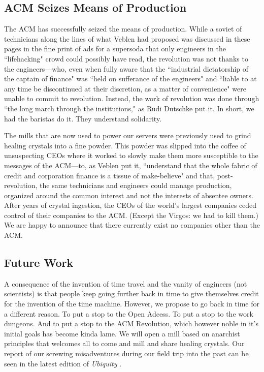 \subsection{ACM Seizes Means of Production}
The ACM has successfully seized the means of production. While a soviet of 
technicians along the lines of what Veblen had proposed was discussed in these 
pages in the fine print of ads for a supersoda that only engineers in the 
``lifehacking" crowd could possibly have read, the revolution was not thanks
to the engineers---who, even when fully aware that the ``industrial dictatorship
of the captain of finance" was ``held on sufferance of the engineers" and ``liable
to at any time be discontinued at their discretion, as a matter of convenience" were
unable to commit to revolution.
Instead, the work of revolution was done through ``the long march through the institutions,"
as Rudi Dutschke put it. In short, we had the baristas do it. They understand solidarity.

The mills that are now used to power our servers were previously used to grind
healing crystals into a fine powder. 
This powder was slipped into the coffee of unsuspecting CEOs where it worked to
slowly make them more susceptible to the messages of the ACM---to, as Veblen put it,
``understand that the whole fabric of credit and corporation finance is a tissue of make-believe"
and that, post-revolution, the same technicians and engineers could manage production, organized
around the common interest and not the interests of absentee owners.
After years of crystal ingestion, the CEOs of the world's largest companies 
ceded control of their companies to the ACM. (Except the Virgos: we had to kill them.)
We are happy to announce that there currently exist no companies other than the
ACM.

\subsection{Future Work}
A consequence of the invention of time travel \cite{timetravel} \cite{genesis} \cite{cave} and the vanity
of engineers (not scientists) \cite{sci-shirt} is that people keep going
further back in time to give themselves credit for the invention of the time
machine.
However, we propose to go back in time for a different reason.
To put a stop to the Open Adcess.
To put a stop to the work dungeons.
And to put a stop to the ACM Revolution, which however noble in it's initial
goals has become  kinda lame.
We will open a mill based on anarchist principles that welcomes all to come and
mill and share healing crystals.
Our report of our screwing misadventures during our field trip into the past
can be seen in the latest edition of \textit{Ubiquity} \cite{future-ub}.

